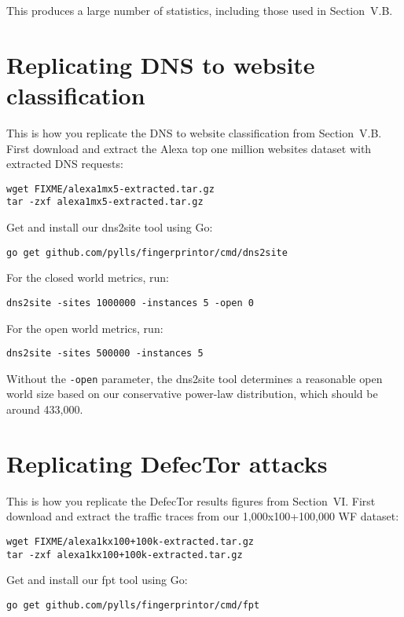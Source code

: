 \documentclass{article}
\newcommand{\name}{DefecTor\xspace}
\begin{document}
This produces a large number of statistics, including those used in Section~V.B.

\section{Replicating DNS to website classification}
This is how you replicate the DNS to website classification from Section~V.B.
First download and extract the Alexa top one million websites dataset with
extracted DNS requests:

\begin{lstlisting}
wget FIXME/alexa1mx5-extracted.tar.gz
tar -zxf alexa1mx5-extracted.tar.gz
\end{lstlisting}

Get and install our dns2site tool using Go:

\begin{lstlisting}
go get github.com/pylls/fingerprintor/cmd/dns2site
\end{lstlisting}

For the closed world metrics, run:

\begin{lstlisting}
dns2site -sites 1000000 -instances 5 -open 0
\end{lstlisting}

For the open world metrics, run:

\begin{lstlisting}
dns2site -sites 500000 -instances 5
\end{lstlisting}

Without the \texttt{-open} parameter, the dns2site tool determines a reasonable
open world size based on our conservative power-law distribution,
which should be around 433,000.

\section{Replicating \name attacks}
This is how you replicate the \name results figures from Section~VI.  First
download and extract the traffic traces from our 1,000x100+100,000 WF dataset:

\begin{lstlisting}
wget FIXME/alexa1kx100+100k-extracted.tar.gz
tar -zxf alexa1kx100+100k-extracted.tar.gz
\end{lstlisting}

Get and install our fpt tool using Go:

\begin{lstlisting}
go get github.com/pylls/fingerprintor/cmd/fpt
\end{lstlisting}
\end{document}
